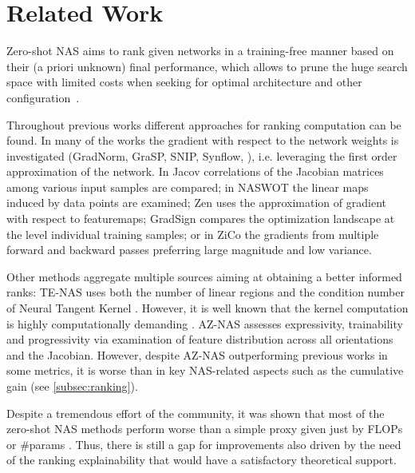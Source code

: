 \section{Related Work}
\label{sec:relatedwork}
\vspace{-5pt}

Zero-shot NAS aims to rank given networks in a training-free manner based on their (a priori unknown) final performance, which allows to prune the huge search space with limited costs when seeking for optimal architecture \cite{ying2019bench, dong2020bench, liu2018darts} and other configuration~\cite{cai2018proxylessnas, lin2021zen, sandler2018mobilenetv2}.

Throughout previous works different approaches for ranking computation can be found. In many of the works the gradient with respect to the network weights is investigated (GradNorm, GraSP, SNIP, Synflow, \cite{tanaka2020pruning, wang2020picking, lee2018snip, abdelfattah2021zero}), i.e. leveraging the first order approximation of the network. In Jacov \cite{abdelfattah2021zero} correlations of the Jacobian matrices among various input samples are compared; in NASWOT \cite{mellor2021neural} the linear maps induced by data points are examined; Zen \cite{lin2021zen} uses the approximation of gradient with respect to featuremaps; GradSign \cite{zhang2021gradsign} compares the optimization landscape at the level individual training samples; or in ZiCo \cite{li2023zico} the gradients from multiple forward and backward passes preferring large magnitude and low variance.



Other methods aggregate multiple sources aiming at obtaining a better informed ranks: TE-NAS \cite{chen2021neural} uses both the number of linear regions \cite{hanin2019complexity, xiong2020number} and the condition number of Neural Tangent Kernel \cite{jacot2018neural, lee2019wide}. However, it is well known that the kernel computation is highly computationally demanding \cite{novak2022fast}. AZ-NAS \cite{lee2024az} assesses expressivity, trainability and progressivity via examination of feature distribution across all orientations and the Jacobian. However, despite AZ-NAS outperforming previous works in some metrics, it is worse than \cite{li2023zico} in key NAS-related aspects such as the cumulative gain (see \cref{subsec:ranking}).

Despite a tremendous effort of the community, it was shown that most of the zero-shot NAS methods perform worse than a simple proxy given just by FLOPs or \#params \cite{ning2021evaluating, white2022deeper}. Thus, there is still a gap for improvements also driven by the need of the ranking explainability that would have a satisfactory theoretical support.

